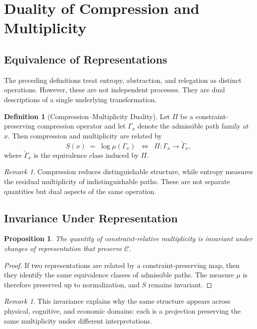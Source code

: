 \documentclass[11pt]{article}
\theoremstyle{plain}
\newtheorem{proposition}[theorem]{Proposition}
\theoremstyle{definition}
\newtheorem{definition}[theorem]{Definition}
\theoremstyle{remark}
\newtheorem{remark}[theorem]{Remark}
\newcommand{\Ss}{S}
\begin{document}
\section{Duality of Compression and Multiplicity}

\subsection{Equivalence of Representations}

The preceding definitions treat entropy, abstraction, and relegation
as distinct operations. However, these are not independent processes.
They are dual descriptions of a single underlying transformation.

\begin{definition}[Compression--Multiplicity Duality]
Let $\Pi$ be a constraint-preserving compression operator and let
$\Gamma_x$ denote the admissible path family at $x$. Then compression
and multiplicity are related by
\[
  \Ss(x) \;=\; \log \mu(\Gamma_x)
  \;\;\Longleftrightarrow\;\;
  \Pi : \Gamma_x \to \tilde{\Gamma}_x,
\]
where $\tilde{\Gamma}_x$ is the equivalence class induced by $\Pi$.
\end{definition}

\begin{remark}
Compression reduces distinguishable structure, while entropy measures
the residual multiplicity of indistinguishable paths. These are not
separate quantities but dual aspects of the same operation.
\end{remark}

\subsection{Invariance Under Representation}

\begin{proposition}
The quantity of constraint-relative multiplicity is invariant under
changes of representation that preserve $\mathcal{C}$.
\end{proposition}

\begin{proof}
If two representations are related by a constraint-preserving map, then
they identify the same equivalence classes of admissible paths. The
measure $\mu$ is therefore preserved up to normalization, and $\Ss$
remains invariant.
\end{proof}

\begin{remark}
This invariance explains why the same structure appears across physical,
cognitive, and economic domains: each is a projection preserving the
same multiplicity under different interpretations.
\end{remark}
\end{document}
